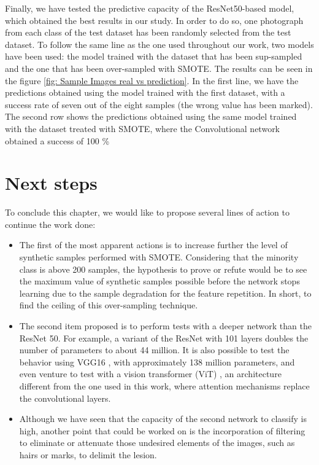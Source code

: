 Finally, we have tested the predictive capacity of the ResNet50-based model, which obtained the best results in our study. In order to do so, one photograph from each class of the test dataset has been randomly selected from the test dataset. To follow the same line as the one used throughout our work, two models have been used: the model trained with the dataset that has been sup-sampled and the one that has been over-sampled with SMOTE. The results can be seen in the figure \ref{fig: Sample Images real vs prediction}. In the first line, we have the predictions obtained using the model trained with the first dataset, with a success rate of seven out of the eight samples (the wrong value has been marked). The second row shows the predictions obtained using the same model trained with the dataset treated with SMOTE, where the Convolutional network obtained a success of 100 \%

\section{Next steps}

To conclude this chapter, we would like to propose several lines of action to continue the work done:
\begin{itemize}
    \item The first of the most apparent actions is to increase further the level of synthetic samples performed with SMOTE. Considering that the minority class is above 200 samples, the hypothesis to prove or refute would be to see the maximum value of synthetic samples possible before the network stops learning due to the sample degradation for the feature repetition. In short, to find the ceiling of this over-sampling technique.
    \item The second item proposed is to perform tests with a deeper network than the ResNet 50. For example, a variant of the ResNet with 101 layers \cite{noauthor_resnet101_nodate} doubles the number of parameters to about 44 million. It is also possible to test the behavior using VGG16 \cite{simonyan_very_2015}, with approximately 138 million parameters, and even venture to test with a vision transformer (ViT) \cite{noauthor_papers_nodate}, an architecture different from the one used in this work, where attention mechanisms replace the convolutional layers. 
    \item Although we have seen that the capacity of the second network to classify is high, another point that could be worked on is the incorporation of filtering to eliminate or attenuate those undesired elements of the images, such as hairs or marks, to delimit the lesion.  
\end{itemize}



